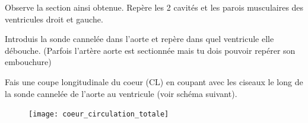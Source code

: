 \documentclass{Controle}
\begin{document}
Observe la section ainsi obtenue. Repère les 2 cavités et les parois musculaires des ventricules droit et gauche.


Introduis la sonde cannelée dans l’aorte et repère dans quel ventricule elle débouche. (Parfois l’artère aorte est sectionnée mais tu dois pouvoir repérer son embouchure)

Fais une coupe longitudinale du coeur (CL) en coupant avec les ciseaux le long de la sonde cannelée de l’aorte au ventricule (voir schéma suivant).

\begin{figure}[ht]
\centering
\end{figure}


\begin{figure}[ht]
\centering
\texttt{[image: coeur\_circulation\_totale]}
\end{figure}
\end{document}
